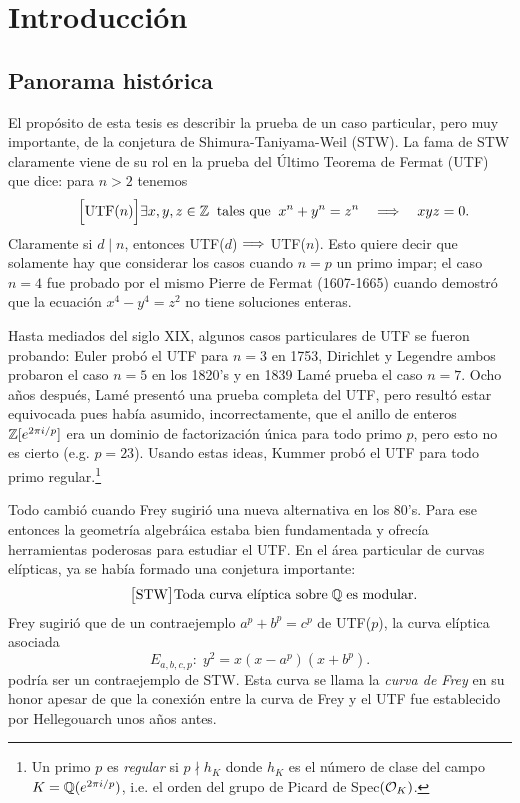 \section{Introducci\'on}

\subsection*{Panorama hist\'orica}

El prop\'osito de esta tesis es describir la prueba de un caso particular, pero muy importante,
de la conjetura de Shimura-Taniyama-Weil (STW). La fama de STW claramente viene de su rol en la
prueba del \'Ultimo Teorema de Fermat (UTF) que dice: para $n>2$ tenemos
\begin{equation}\tag*{$\Big[\mathrm{UTF}(n)\Big]$}
  \exists x,y,z\in\ZZ\;\;\text{tales que}\;\; x^n+y^n=z^n\quad\then\quad xyz=0.
\end{equation}
Claramente si $d\mid n$, entonces UTF($d$) $\Longrightarrow$ UTF($n$). Esto quiere decir que solamente hay
que considerar los casos cuando $n=p$ un primo impar; el caso $n=4$ fue probado por el mismo Pierre
de Fermat (1607-1665) cuando demostr\'o que la ecuaci\'on $x^4-y^4=z^2$ no tiene soluciones enteras.

Hasta mediados del siglo XIX, algunos casos particulares de UTF se fueron probando:
Euler prob\'o el UTF para $n=3$ en 1753, Dirichlet y Legendre ambos probaron el caso $n=5$ en los
1820's y en 1839 Lam\'e prueba el caso $n=7$. Ocho a\~nos despu\'es, Lam\'e present\'o una
prueba completa del UTF, pero result\'o estar equivocada pues hab\'ia asumido, incorrectamente,
que el anillo de enteros $\mathbb{Z}[e^{2\pi i/p}]$ era un dominio de factorizaci\'on \'unica para todo
primo $p$, pero esto no es cierto (e.g. $p=23$). Usando estas ideas, Kummer prob\'o el UTF para
todo primo regular.\footnote{Un primo $p$ es \emph{regular} si $p\nmid h_K$ donde $h_K$ es el
  n\'umero de clase del campo $K=\mathbb{Q}(e^{2\pi i/p})$, i.e. el orden del grupo de Picard de
  Spec$(\mathcal{O}_K)$.}

Todo cambi\'o cuando Frey sugiri\'o una nueva alternativa en los 80's. Para ese entonces la
geometr\'ia algebr\'aica estaba bien fundamentada y ofrec\'ia herramientas poderosas para estudiar
el UTF. En el \'area particular de curvas el\'ipticas, ya se hab\'ia formado una conjetura
importante:
\begin{equation}\tag*{$\big[\mathrm{STW}\big]$}
  \text{Toda curva el\'iptica sobre}\;\QQ\;\text{es modular.}
\end{equation}
Frey sugiri\'o que de un contraejemplo $a^p+b^p=c^p$ de UTF($p$), la curva el\'iptica asociada
\[
  E_{a,b,c,p}:\; y^2=x(x-a^p)(x+b^p).
\]
podr\'ia ser un contraejemplo de STW. Esta curva se llama la \emph{curva de Frey} en su honor
apesar de que la conexi\'on entre la curva de Frey y el UTF fue establecido por Hellegouarch
unos a\~nos antes.

